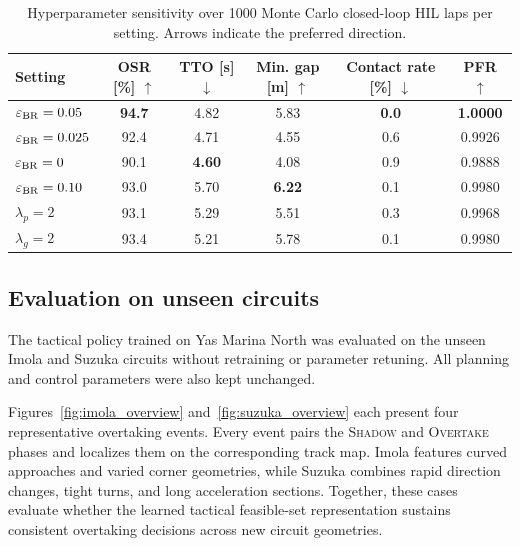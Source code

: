 \documentclass[journal,twoside,web]{ieeecolor}
\begin{document}
\begin{table}[H]
\centering
\footnotesize
\setlength{\tabcolsep}{1.2pt}
\renewcommand{\arraystretch}{1.08}
\caption{Hyperparameter sensitivity over 1000 Monte Carlo closed-loop HIL
laps per setting. Arrows indicate the preferred direction.}
\label{tab:sensitivity}
\begin{tabular}{@{}lccccc@{}}
\toprule
Setting & \shortstack{OSR [\%]\\$\uparrow$} &
\shortstack{TTO [s]\\$\downarrow$} &
\shortstack{Min. gap [m]\\$\uparrow$} &
\shortstack{Contact rate [\%]\\$\downarrow$} &
\shortstack{PFR\\$\uparrow$} \\
\midrule
$\varepsilon_{\rm BR}=0.05$
& \textbf{94.7} & 4.82 & 5.83 & \textbf{0.0} & \textbf{1.0000} \\
$\varepsilon_{\rm BR}=0.025$
& 92.4 & 4.71 & 4.55 & 0.6 & 0.9926 \\
$\varepsilon_{\rm BR}=0$
& 90.1 & \textbf{4.60} & 4.08 & 0.9 & 0.9888 \\
$\varepsilon_{\rm BR}=0.10$
& 93.0 & 5.70 & \textbf{6.22} & 0.1 & 0.9980 \\
$\lambda_p=2$
& 93.1 & 5.29 & 5.51 & 0.3 & 0.9968 \\
$\lambda_g=2$
& 93.4 & 5.21 & 5.78 & 0.1 & 0.9980 \\
\bottomrule
\end{tabular}
\end{table}

\subsection{Evaluation on unseen circuits}
\label{subsec:unseen_track}

The tactical policy trained on Yas Marina North was evaluated on the
unseen Imola and Suzuka circuits without retraining or parameter retuning. All
planning and control parameters were also kept unchanged.

Figures~\ref{fig:imola_overview} and~\ref{fig:suzuka_overview} each present four
representative overtaking events. Every event pairs the \textsc{Shadow} and
\textsc{Overtake} phases and localizes them on the corresponding track map.
Imola features curved approaches and varied corner geometries, while Suzuka
combines rapid direction changes, tight turns, and long acceleration sections.
Together, these cases evaluate whether the learned tactical feasible-set
representation sustains consistent overtaking decisions across new circuit
geometries.
\end{document}
